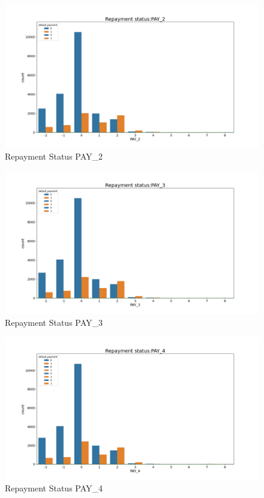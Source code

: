 \documentclass[
]{article}
\begin{document}
\begin{figure}

{\centering \includegraphics[width=0.8\linewidth]{../results/repayment_status_PAY_2} 

}

\caption{Repayment Status PAY_2}\label{fig:repayment-status-PAY-2}
\end{figure}

\begin{figure}

{\centering \includegraphics[width=0.8\linewidth]{../results/repayment_status_PAY_3} 

}

\caption{Repayment Status PAY_3}\label{fig:repayment-status-PAY-3}
\end{figure}

\begin{figure}

{\centering \includegraphics[width=0.8\linewidth]{../results/repayment_status_PAY_4} 

}

\caption{Repayment Status PAY_4}\label{fig:repayment-status-PAY-4}
\end{figure}
\end{document}
